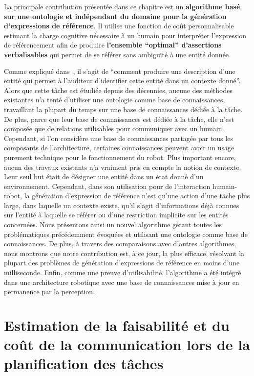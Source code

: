 La principale contribution présentée dans ce chapitre est un \textbf{algorithme basé sur une ontologie et indépendant du domaine pour la génération d'expressions de référence}. Il utilise une fonction de coût personnalisable estimant la charge cognitive nécessaire à un humain pour interpréter l'expression de référencement afin de produire \textbf{l'ensemble ``optimal'' d'assertions verbalisables} qui permet de se référer sans ambiguïté à une entité donnée.


Comme expliqué dans~\cite{reiter_2000_building}, il s'agit de ``comment produire une description d'une entité qui permet à l'auditeur d'identifier cette entité dans un contexte donné''. Alors que cette tâche est étudiée depuis des décennies, aucune des méthodes existantes n'a tenté d'utiliser une ontologie comme base de connaissances, travaillant la plupart du temps sur une base de connaissances dédiée à la tâche. De plus, parce que leur base de connaissances est dédiée à la tâche, elle n'est composée que de relations utilisables pour communiquer avec un humain. Cependant, si l’on considère une base de connaissances partagée par tous les composants de l’architecture, certaines connaissances peuvent avoir un usage purement technique pour le fonctionnement du robot. Plus important encore, aucun des travaux existants n'a vraiment pris en compte la notion de contexte. Leur seul but était de désigner une entité dans un état donné d'un environnement. Cependant, dans son utilisation pour de l'interaction humain-robot, la génération d'expression de référence n'est qu'une action d'une tâche plus large, dans laquelle un contexte existe, qu'il s'agit d'informations déjà connues sur l'entité à laquelle se référer ou d'une restriction implicite sur les entités concernées. Nous présentons ainsi un nouvel algorithme gérant toutes les problématiques précédemment évoquées et utilisant une ontologie comme base de connaissances. De plus, à travers des comparaisons avec d'autres algorithmes, nous montrons que notre contribution est, à ce jour, la plus efficace, résolvant la plupart des problèmes de génération d'expressions de référence en moins d'une milliseconde. Enfin, comme une preuve d'utilisabilité, l'algorithme a été intégré dans une architecture robotique avec une base de connaissances mise à jour en permanence par la perception. 

\section*{Estimation de la faisabilité et du coût de la communication lors de la planification des tâches}

